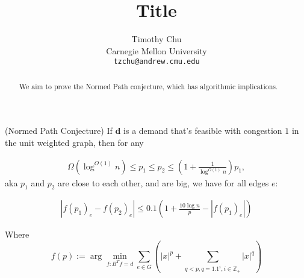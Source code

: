 


\title{Title}
\author{
  Timothy Chu \\
  Carnegie Mellon University\\
  \texttt{tzchu@andrew.cmu.edu}
}

\setcounter{page}{0}
\maketitle
\thispagestyle{empty}
\begin{abstract}
  We aim to prove the Normed Path conjecture, which has
  algorithmic implications.
\end{abstract}
\begin{theorem} (Normed Path Conjecture) If $\textbf{d}$ is a
  demand that's feasible with congestion $1$ in the unit weighted
  graph, then for any

  \begin{align}
    \Omega\left(\log^{O(1)} n\right) \leq p_1 \leq p_2 \leq \left(1 +
    \frac{1}{\log^{O(1)}n} \right)p_1,
  \end{align}
  aka $p_1$ and $p_2$ are close to each other, and are big, we
  have for all edges $e$:

  \begin{align}
  |f(p_1)_e - f(p_2)_e| \leq 0.1\left(1+\frac{10 \log n }{p} - |
  f(p_1)_e| \right)
  \end{align}
\end{theorem}

Where
\[ 
f(p) := \arg \min_{f : B^T f = d} \sum_{e \in G} \left(|x|^p + \sum_{q <
p, q = 1.1^i, i \in \mathbb{Z}_+} |x|^q\right)
\]
\clearpage


\begin{appendix}
\end{appendix}

